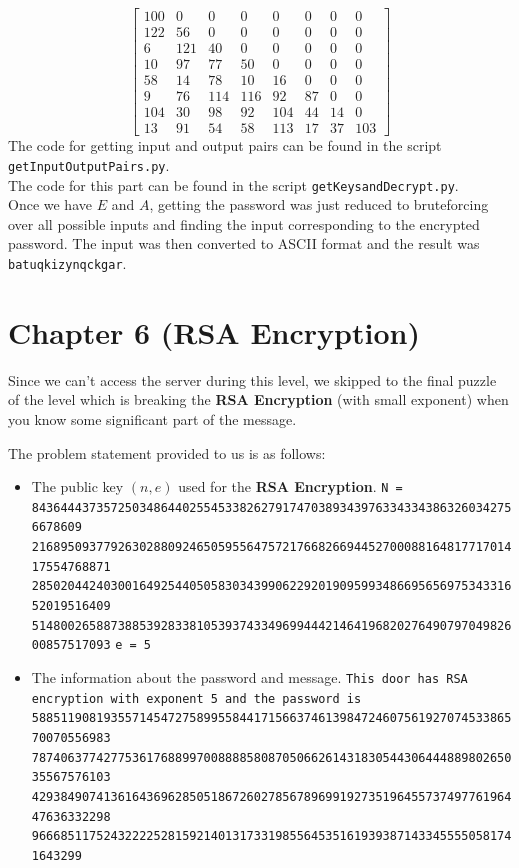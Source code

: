 \documentclass[10pt,twoside]{article}
\begin{document}
 $$\begin{bmatrix}
 100& 0& 0& 0& 0& 0& 0& 0\\
 122&56& 0& 0& 0& 0& 0& 0\\
 6 &121&40& 0& 0& 0& 0& 0\\
  10&97&77&50& 0& 0& 0& 0\\
  58&14&78&10&16& 0& 0& 0\\
 9&76 &114 &116&92&87& 0& 0\\
 104&30&98&92 &104&44&14& 0\\
  13&91&54&58 &113&17&37 &103
  \end{bmatrix}$$
The code for getting input and output pairs can be found in the script \texttt{getInputOutputPairs.py}.\\

The code for this part can be found in the script \texttt{getKeysandDecrypt.py}.\\
Once we have $E$ and $A$, getting the password was just reduced to bruteforcing over all possible inputs and finding the input corresponding to the encrypted password. The input was then converted to ASCII format and the result was \texttt{batuqkizynqckgar}.

\section{Chapter 6 (RSA Encryption)}

Since we can't access the server during this level, we skipped to the final puzzle of the level which is breaking the \textbf{RSA Encryption} (with small exponent) when you know some significant part of the message.

The problem statement provided to us is as follows:

\begin{itemize}
  \item The public key $(n,e)$ used for the \textbf{RSA Encryption}. \newline
    \texttt{N = 84364443735725034864402554533826279174703893439763343343863260342756678609 \\ 216895093779263028809246505955647572176682669445270008816481771701417554768871 \\ 285020442403001649254405058303439906229201909599348669565697534331652019516409 \\ 514800265887388539283381053937433496994442146419682027649079704982600857517093} \newline
    \texttt{e = 5}
  \item The information about the password and message. \newline
    \texttt{This door has RSA encryption with exponent 5 and the password is} \newline
    \texttt{588511908193557145472758995584417156637461398472460756192707453386570070556983 \\ 787406377427753617688997008888580870506626143183054430644488980265035567576103 \\ 429384907413616436962850518672602785678969919273519645573749776196447636332298 \\ 96668511752432222528159214013173319855645351619393871433455550581741643299}
\end{itemize}
\end{document}
